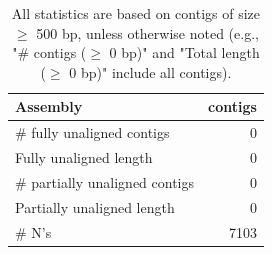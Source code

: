\documentclass[12pt,a4paper]{article}
\begin{document}
\begin{table}[ht]
\begin{center}
\caption{All statistics are based on contigs of size $\geq$ 500 bp, unless otherwise noted (e.g., "\# contigs ($\geq$ 0 bp)" and "Total length ($\geq$ 0 bp)" include all contigs).}
\begin{tabular}{|l*{1}{|r}|}
\hline
Assembly & contigs \\ \hline
\# fully unaligned contigs & 0 \\ \hline
Fully unaligned length & 0 \\ \hline
\# partially unaligned contigs & 0 \\ \hline
Partially unaligned length & 0 \\ \hline
\# N's & 7103 \\ \hline
\end{tabular}
\end{center}
\end{table}
\end{document}
